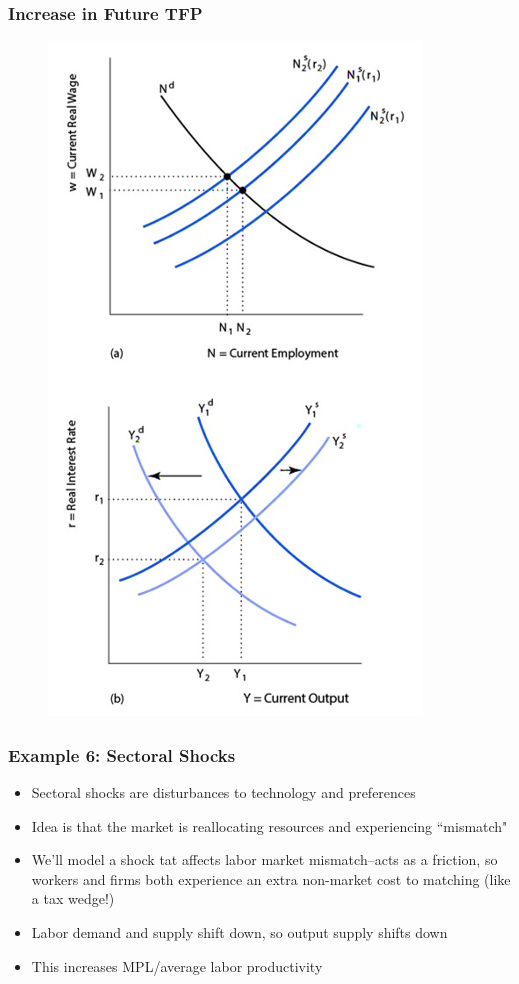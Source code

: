 \documentclass{beamer}
\begin{document}
\begin{frame} 
\frametitle[alignment=center]{Increase in Future TFP} 
\begin{figure}
\centering
\includegraphics[scale=0.52]{Figures/W_Fig_11pt29.png}
\end{figure}
\end{frame}

\begin{frame}
\frametitle[alignment=center]{Example 6: Sectoral Shocks} 
\begin{itemize}
\item Sectoral shocks are disturbances to technology and preferences
\bigskip
\item Idea is that the market is reallocating resources and experiencing ``mismatch"
\bigskip
\item We'll model a shock tat affects labor market mismatch--acts as a friction, so workers and firms both experience an extra non-market cost to matching (like a tax wedge!)
\bigskip
\item Labor demand and supply shift down, so output supply shifts down
\bigskip
\item This increases MPL/average labor productivity 
\end{itemize}
\end{frame}
\end{document}
